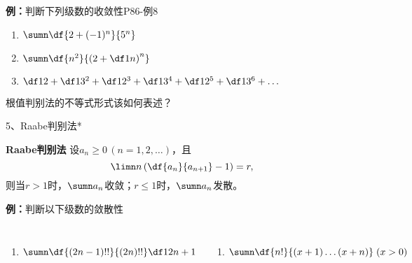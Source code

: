 \begin{frame}
	\linespread{1.5}
	\begin{exampleblock}{{\bf 例：}判断下列级数的收敛性\hfill P86-例8}
		\begin{enumerate}\pause 
		  \item $\sumn\df{2+(-1)^n}{5^n}$\pause
		  \item $\sumn\df{n^2}{\left(2+\df 1n\right)^n}$\pause
		  \item $\df 12+\df 1{3^2}+\df 1{2^3}+\df 1{3^4}+\df 1{2^5}+\df 1{3^6}+\ldots$
		\end{enumerate}
	\end{exampleblock}
	\pause
	根值判别法的不等式形式该如何表述？
\end{frame}

\begin{frame}{5、Raabe判别法*}
	\linespread{1.2}\pause 
	\vspace{-1ex}
	\begin{block}{{\bf Raabe判别法}\hfill}
		设$a_n\geq 0\,(n=1,2,\ldots)$，且
		$$\limn n\left(\df{a_n}{a_{n+1}}-1\right)=r,$$
		则当$r>1$时，$\sumn a_n$收敛；$r\leq 1$时，$\sumn a_n$发散。		
		\pause 
	\end{block}
	\begin{exampleblock}{{\bf 例：}判断以下级数的敛散性\hfill}
		\begin{columns}
				\begin{enumerate}
				  \item {\small $\sumn\df{(2n-1)!!}{(2n)!!}\df 1{2n+1}$}
				\end{enumerate}
				\begin{enumerate}
				  \addtocounter{enumi}{1}
				  \item {\small $\sumn\df{n!}{(x+1)\ldots(x+n)}\;(x>0)$}
				\end{enumerate}
		\end{columns}
	\end{exampleblock}
\end{frame}

